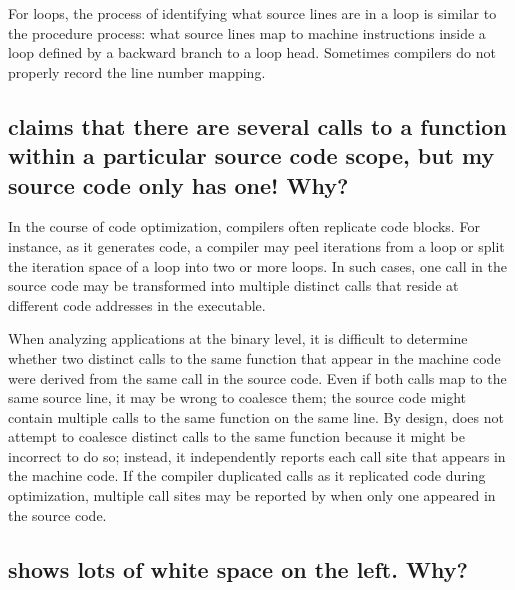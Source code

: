 \documentclass[11pt,twoside,letterpaper]{report}
\begin{document}
For loops, the process of identifying what source lines are in a loop is similar to the procedure process: what source lines map to machine instructions inside a loop defined by a backward branch to a loop head.
Sometimes compilers do not properly record the line number mapping.




\subsection{\hpcviewer{} claims that there are several calls to a function within a particular source code scope, but my source code only has one!  Why?}

In the course of code optimization, compilers often replicate code blocks.
For instance, as it generates code, a compiler may peel iterations from a loop or split the iteration space of a loop into two or more loops.
In such cases, one call in the source code may be transformed into multiple distinct calls that reside at different code addresses in the executable.

When analyzing applications at the binary level, it is difficult to determine whether two distinct calls to the same function that appear in the machine code were derived from the same call in the source code.
Even if both calls map to the same source line, it may be wrong to coalesce them; the source code might contain multiple calls to the same function on the same line.
By design, \HPCToolkit{} does not attempt to coalesce distinct calls to the same function because it might be incorrect to do so; instead, it independently reports each call site that appears in the machine code.
If the compiler duplicated calls as it replicated code during optimization, multiple call sites may be reported by \hpcviewer{} when only one appeared in the source code.


\subsection{\hpctraceviewer{} shows lots of white space on the left. Why?}
\end{document}
